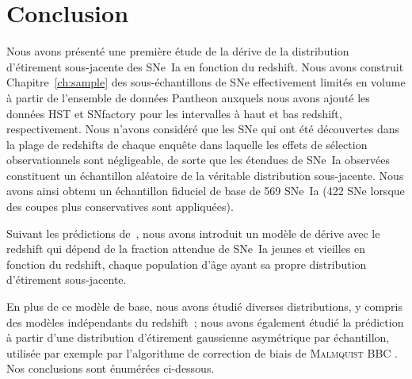 \documentclass[../main/main.tex]{subfiles}
\begin{document}
\section{Conclusion}\label{ssec:xccl}

Nous avons présenté une première étude de la dérive de la distribution
d'étirement sous-jacente des SNe~Ia en fonction du redshift. Nous avons
construit Chapitre~\ref{ch:sample} des sous-échantillons de SNe effectivement
limités en volume à partir de l'ensemble de données Pantheon \citep[][SDSS, PS1,
SNLS]{scolnic2018} auxquels nous avons ajouté les données HST et SNfactory
\citep{rigault2020} pour les intervalles à haut et bas redshift, respectivement.
Nous n'avons considéré que les SNe qui ont été découvertes dans la plage de
redshifts de chaque enquête dans laquelle les effets de sélection
observationnels sont négligeable, de sorte que les étendues de SNe~Ia observées
constituent un échantillon aléatoire de la véritable distribution sous-jacente.
Nous avons ainsi obtenu un échantillon fiduciel de base de 569 SNe~Ia (422 SNe
lorsque des coupes plus conservatives sont appliquées). 

Suivant les prédictions de~\cite{rigault2020}, nous avons introduit un modèle de
dérive avec le redshift qui dépend de la fraction attendue de SNe~Ia
jeunes et vieilles en fonction du redshift, chaque population d'âge ayant sa
propre distribution d'étirement sous-jacente.

En plus de ce modèle de base, nous avons étudié diverses distributions, y
compris des modèles indépendants du redshift~; nous avons également étudié la
prédiction à partir d'une distribution d'étirement gaussienne asymétrique par
échantillon, utilisée par exemple par l'algorithme de correction de biais de
\textsc{Malmquist} BBC \citep{scolnic2016, kessler2017}. Nos conclusions sont
énumérées ci-dessous.
\end{document}
